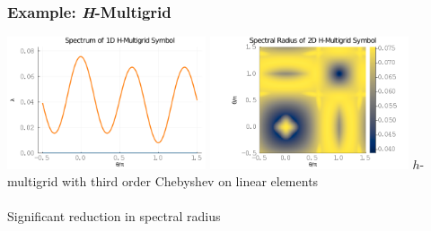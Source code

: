 \documentclass{beamer}
\begin{document}

\begin{frame}
\begin{center}
\frametitle{Example: {\textit H}-Multigrid}

\includegraphics[height=3.9cm]{../img/hmultigridSymbol1D}
\includegraphics[height=3.9cm]{../img/hmultigridSymbol2D}
{\small $h$-multigrid with third order Chebyshev on linear elements}\\

~\\

Significant reduction in spectral radius

\end{center}
\end{frame}

\end{document}
